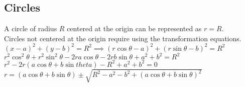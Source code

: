 \subsection{Circles}
\noindent
A circle of radius $R$ centered at the origin can be represented as $r=R$.\\
Circles not centered at the origin require using the transformation equations.
\indent
$(x-a)^2+(y-b)^2=R^2\implies(r\cos{\theta}-a)^2+(r\sin{\theta}-b)^2=R^2$\\
\indent
$r^2\cos^{2}{\theta}+r^2\sin^{2}{\theta}-2ra\cos{\theta}-2rb\sin{\theta}+a^2+b^2=R^2$\\
\indent
$r^2-2r(a\cos{\theta}+b\sin{theta})-R^2+a^2+b^2=0$\\
\indent
$r=(a\cos{\theta}+b\sin{\theta})\pm\sqrt{R^2-a^2-b^2+(a\cos{\theta}+b\sin{\theta})^2}$\\